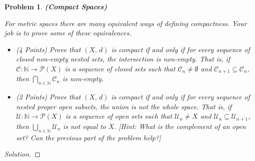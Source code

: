 \documentclass{article}
\theoremstyle{normal}
\newtheorem{problem}{Problem}
\begin{document}
    \begin{problem}
        \textbf{(Compact Spaces)}
        \par\hfill\par
        For metric spaces there are many equivalent ways of defining
        compactness. Your job is to prove some of these equivalences.
        \begin{itemize}
            \item (4 Points) Prove that $(X,\,d)$ is compact if and only if
                for every sequence of closed non-empty nested sets, the
                intersection is non-empty. That is, if
                $\mathcal{C}:\mathbb{N}\rightarrow\mathcal{P}(X)$ is a sequence
                of closed sets such that $\mathcal{C}_{n}\ne\emptyset$ and
                $\mathcal{C}_{n+1}\subseteq\mathcal{C}_{n}$, then
                $\bigcap_{n\in\mathbb{N}}\mathcal{C}_{n}$ is non-empty.
            \item (2 Points) Prove that $(X,\,d)$ is compact if and only if for
                every sequence of nested proper open subsets, the union is not
                the whole space. That is, if
                $\mathcal{U}:\mathbb{N}\rightarrow\mathcal{P}(X)$ is a sequence
                of open sets such that $\mathcal{U}_{n}\ne{X}$ and
                $\mathcal{U}_{n}\subseteq\mathcal{U}_{n+1}$, then
                $\bigcup_{n\in\mathbb{N}}\mathcal{U}_{n}$ is not equal to $X$.
                [Hint: What is the complement of an open set? Can the previous
                part of the problem help?]
        \end{itemize}
    \end{problem}
    \color{black}
    \begin{proof}[Solution]
    \end{proof}
    \newpage
    \color{blue}
\end{document}
